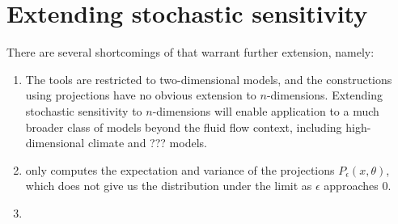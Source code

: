 
\chapter{Extending stochastic sensitivity}

There are several shortcomings of \cite{Balasuriya_2020_StochasticSensitivityComputable} that warrant further extension, namely:

\begin{enumerate}
	\item The tools are restricted to two-dimensional models, and the constructions using projections have no obvious extension to \(n\)-dimensions.
	      Extending stochastic sensitivity to \(n\)-dimensions will enable application to a much broader class of models beyond the fluid flow context, including high-dimensional climate and ??? models.

	\item \cite{Balasuriya_2020_StochasticSensitivityComputable} only computes the expectation and variance of the projections \(P_\epsilon(x,\theta)\), which does not give us the distribution under the limit as \(\epsilon\) approaches 0.

	\item
\end{enumerate}




